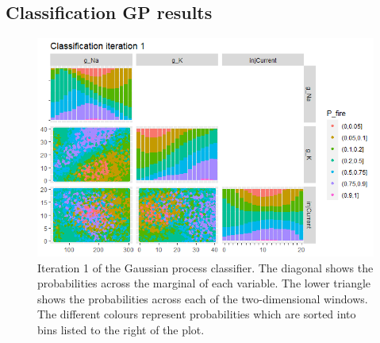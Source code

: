 \documentclass{article}
\begin{document}
\subsection{Classification GP results}
\begin{figure}[t]
    \centering
    \includegraphics[width=\linewidth]{Example1/class1.png}
    \caption{Iteration 1 of the Gaussian process classifier. The diagonal shows the probabilities across the marginal of each variable. The lower triangle shows the probabilities across each of the two-dimensional windows. The different colours represent probabilities which are sorted into bins listed to the right of the plot.}
    \label{fig:ex1-class1}
\end{figure}
\end{document}

